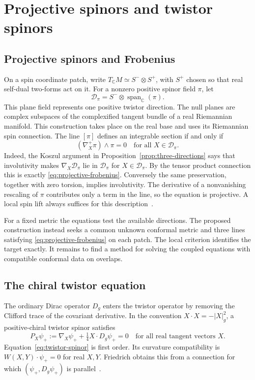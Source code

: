 \documentclass[11pt]{article}
\numberwithin{equation}{section}
\begin{document}
\section{Projective spinors and twistor spinors}
\label{sec:spinors}

\subsection{Projective spinors and Frobenius}

On a spin coordinate patch, write \(T_{\mathbb C}M\simeq
S^-\otimes S^+\), with \(S^+\) chosen so that real self-dual
two-forms act on it. For a nonzero positive spinor field \(\pi\),
let
\[
 \mathcal D_\pi=S^-\otimes\operatorname{span}_{\mathbb C}(\pi).
\]
This plane field represents one positive twistor direction.
The null planes are complex subspaces of the complexified tangent
bundle of a real Riemannian manifold. This construction takes
place on the real base and uses its Riemannian spin connection.
The line \([\pi]\) defines an integrable section if and only if
\begin{equation}\label{eq:projective-frobenius}
 (\nabla^+_X\pi)\wedge\pi=0
 \quad\text{for all }X\in\mathcal D_\pi.
\end{equation}
Indeed, the Koszul argument in Proposition~\ref{prop:three-directions}
says that involutivity makes \(\nabla_X\mathcal D_\pi\) lie in
\(\mathcal D_\pi\) for \(X\in\mathcal D_\pi\). By the tensor product
connection this is exactly \eqref{eq:projective-frobenius}.
Conversely the same preservation, together with zero torsion,
implies involutivity. The derivative of a nonvanishing rescaling of
\(\pi\) contributes only a term in the line, so the equation is
projective. A local spin lift always suffices for this
description~\cite[\S3 and \S7.1]{GoverHillNurowski2011GoldbergSachs}.

For a fixed metric the equations test the available directions.
The proposed construction instead seeks a common unknown conformal
metric and three lines satisfying \eqref{eq:projective-frobenius}
on each patch. The local criterion identifies the target exactly.
It remains to find a method for solving the coupled equations
with compatible conformal data on overlaps.

\subsection{The chiral twistor equation}

The ordinary Dirac operator \(D_g\) enters the twistor operator by
removing the Clifford trace of the covariant derivative. In the
convention \(X\cdot X=-|X|_g^2\), a positive-chiral twistor spinor
satisfies
\begin{equation}\label{eq:twistor-spinor}
 P_X\psi_+ :=\nabla_X\psi_++\tfrac14 X\cdot D_g\psi_+=0
 \quad\text{for all real tangent vectors }X.
\end{equation}
Equation~\eqref{eq:twistor-spinor} is first order. Its curvature
compatibility is \(W(X,Y)\cdot\psi_+=0\) for real \(X,Y\).
Friedrich obtains this from a connection for which
\((\psi_+,D_g\psi_+)\) is parallel~\cite[eq.~(1.1) and pp.~61--62]{Friedrich1990TwistorSpinors}.
\end{document}
